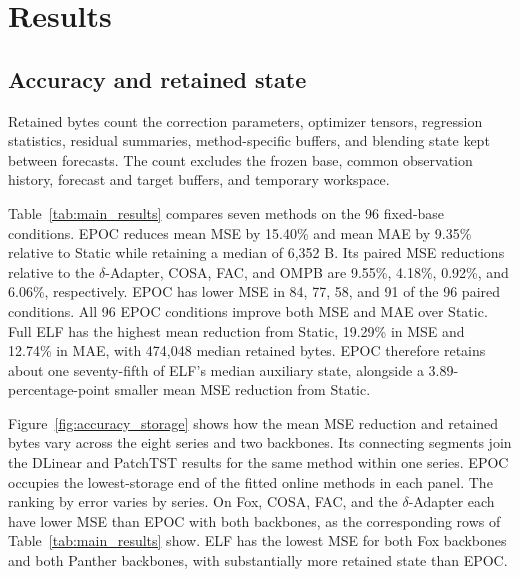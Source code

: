 \section{Results}
\label{sec:results}

\subsection{Accuracy and retained state}
Retained bytes count the correction parameters, optimizer tensors, regression statistics, residual summaries, method-specific buffers, and blending state kept between forecasts. The count excludes the frozen base, common observation history, forecast and target buffers, and temporary workspace.

Table~\ref{tab:main_results} compares seven methods on the 96 fixed-base conditions. EPOC reduces mean MSE by 15.40\% and mean MAE by 9.35\% relative to Static while retaining a median of 6,352 B. Its paired MSE reductions relative to the $\delta$-Adapter, COSA, FAC, and OMPB are 9.55\%, 4.18\%, 0.92\%, and 6.06\%, respectively. EPOC has lower MSE in 84, 77, 58, and 91 of the 96 paired conditions. All 96 EPOC conditions improve both MSE and MAE over Static. Full ELF has the highest mean reduction from Static, 19.29\% in MSE and 12.74\% in MAE, with 474,048 median retained bytes. EPOC therefore retains about one seventy-fifth of ELF's median auxiliary state, alongside a 3.89-percentage-point smaller mean MSE reduction from Static.

\begin{table}[!t]
\caption{Seven-method comparison on 96 matched conditions. The overview averages condition-wise reductions from Static; retained-byte multiples are relative to EPOC (6,352 B) and rounded to integers. The MSE and MAE panels average losses over three seeds and the legacy/refit variants within each series--backbone pair. The rightmost ratio divides EPOC's unrounded loss by the lowest unrounded loss in that row; 1 indicates the best result. Bold marks row-minimum losses and the corresponding ratio when EPOC is best. All corrections use global blending.}
\label{tab:main_results}
\centering

\end{table}

Figure~\ref{fig:accuracy_storage} shows how the mean MSE reduction and retained bytes vary across the eight series and two backbones. Its connecting segments join the DLinear and PatchTST results for the same method within one series. EPOC occupies the lowest-storage end of the fitted online methods in each panel. The ranking by error varies by series. On Fox, COSA, FAC, and the $\delta$-Adapter each have lower MSE than EPOC with both backbones, as the corresponding rows of Table~\ref{tab:main_results} show. ELF has the lowest MSE for both Fox backbones and both Panther backbones, with substantially more retained state than EPOC.


